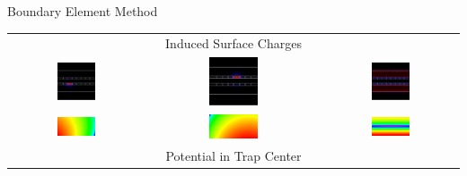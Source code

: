 \documentclass{beamer}
\begin{document}
\begin{frame}{Boundary Element Method}
	\begin{table}\begin{tabular}{ccc}
		\centering
		& Induced Surface Charges & \\
		\includegraphics[width=0.3\textwidth]{dc_5} &
		\includegraphics[width=0.3\textwidth]{dc_10} &
		\includegraphics[width=0.3\textwidth]{rf_rails} \\

		\includegraphics[width=0.3\textwidth]{yz_5} &
		\includegraphics[width=0.3\textwidth]{yz_10} &
		\includegraphics[width=0.3\textwidth]{yz_rf} \\
		& Potential in Trap Center &
	\end{tabular}\end{table}
\end{frame}
\end{document}
